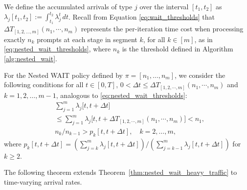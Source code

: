 We define the accumulated arrivals of type $j$ over the interval $[t_1, t_2]$ as $\lambda_j[t_1, t_2] := \int_{t_1}^{t_2} \lambda_j^t \, dt$. Recall from Equation \eqref{eq:wait_thresholds} that $\Delta T_{[1,2,\dots,m]}(n_1,\cdots,n_m)$ represents the per-iteration time cost when processing exactly $n_k$ prompts at each stage in segment $k$, for all $k \in [m]$, as in \eqref{eq:nested_wait_thresholds}, where $n_k$ is the threshold defined in Algorithm \ref{alg:nested_wait}.

For the Nested WAIT policy defined by $\pi = [n_1, \dots, n_m]$, we consider the following conditions for all $t\in [0, T]$, $0<\Delta t\leq \Delta T_{[1,2,\cdots,m]}(n_1,\cdots,n_m)$ and $k = 1, 2, \dots, m-1$, analogous to \eqref{eq:nested_wait_thresholds}:
\begin{equation}
    \label{eq:nested_wait_thresholds_time_varying}
\begin{aligned}
        & \sum_{j=1}^m \lambda_j\big[t, t + \Delta t\big] \\&\leq \sum_{j=1}^m \lambda_j\big[t, t +\Delta T_{[1,2,\cdots,m]}(n_1,\cdots,n_m)\big]< n_1, \\
        & n_k/n_{k-1} > p_k[t,t+\Delta t],\quad k=2,\dots,m,
\end{aligned}
\end{equation}
where $p_k[t,t+\Delta t] = (\sum_{j=k}^m\lambda_j[t,t+\Delta t])/(\sum_{j=k-1}^m\lambda_j[t,t+\Delta t])$ for \(k\ge2\).

The following theorem extends Theorem~\ref{thm:nested_wait_heavy_traffic} to time-varying arrival rates.

